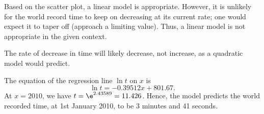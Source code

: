 \begin{solution}
    \begin{ppart}
        \begin{figure}[H]
            \centering
        \end{figure}
    \end{ppart}
    \begin{ppart}
        Based on the scatter plot, a linear model is appropriate. However, it is unlikely for the world record time to keep on decreasing at its current rate; one would expect it to taper off (approach a limiting value). Thus, a linear model is not appropriate in the given context.
    \end{ppart}
    \begin{ppart}
        The rate of decrease in time will likely decrease, not increase, as a quadratic model would predict.
    \end{ppart}
    \begin{ppart}
        The equation of the regression line $\ln t$ on $x$ is \[\ln t = -0.39512 x + 801.67.\] At $x = 2010$, we have $t = \e^{2.43589} = 11.426$. Hence, the model predicts the world recorded time, at 1st January 2010, to be 3 minutes and 41 seconds.
    \end{ppart}
\end{solution}

